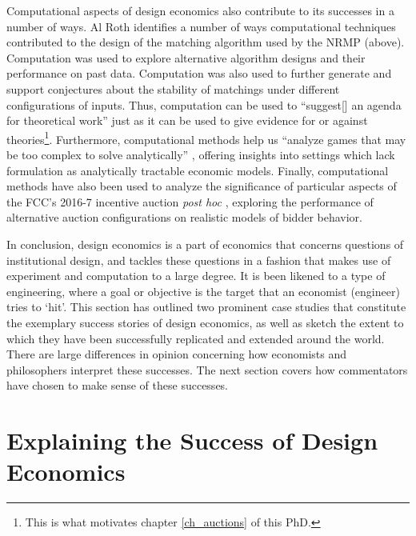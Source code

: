 Computational aspects of design economics also contribute to its successes in a number of ways. Al Roth \autocite*{roth2002} identifies a number of ways computational techniques contributed to the design of the matching algorithm used by the NRMP (above). Computation was used to explore alternative algorithm designs and their performance on past data. Computation was also used to further generate and support conjectures about the stability of matchings under different configurations of inputs. Thus, computation can be used to ``suggest[] an agenda for theoretical work'' \autocite[1363]{roth2002} just as it can be used to give evidence for or against theories\footnote{This is what motivates chapter \ref{ch_auctions} of this PhD.}. Furthermore, computational methods help us ``analyze games that may be too complex to solve analytically'' \autocite[1374]{roth2002}, offering insights into settings which lack formulation as analytically tractable economic models. Finally, computational methods have also been used to analyze the significance of particular aspects of the FCC's 2016-7 incentive auction \textit{post hoc} \autocite{newman2024}, exploring the performance of alternative auction configurations on realistic models of bidder behavior.

In conclusion, design economics is a part of economics that concerns questions of institutional design, and tackles these questions in a fashion that makes use of experiment and computation to a large degree. It is been likened to a type of engineering, where 
a goal or objective is the target that an economist (engineer) tries to `hit'. This section has outlined two prominent case studies that constitute the exemplary success stories of design economics, as well as sketch the extent to which they have been successfully replicated and extended around the world. There are large differences in opinion concerning how economists and philosophers interpret these successes. The next section covers how commentators have chosen to make sense of these successes.





\section{Explaining the Success of Design Economics}\label{fable_sec_success}


